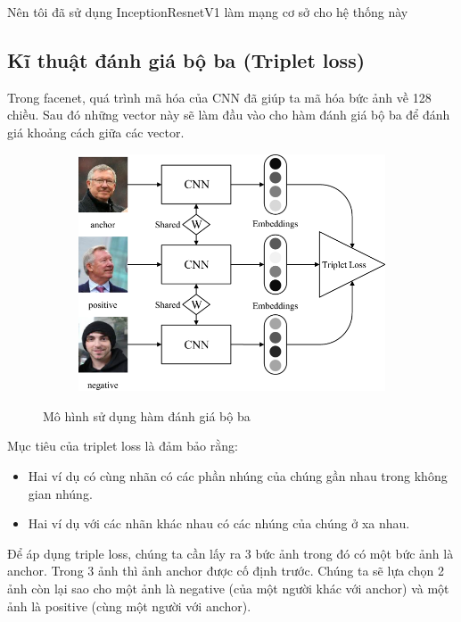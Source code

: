 Nên tôi đã sử dụng InceptionResnetV1 làm mạng cơ sở cho hệ thống này

\newpage
\subsection{Kĩ thuật đánh giá bộ ba (Triplet loss)}
Trong facenet, quá trình mã hóa của CNN đã giúp ta mã hóa bức ảnh về 128 chiều.
Sau đó những vector này sẽ làm đầu vào cho hàm đánh giá bộ ba để đánh giá khoảng
cách giữa các vector.

\begin{figure}
    \begin{subfigure}{1.\textwidth}
        \begin{center}
            \includegraphics[width=1.\linewidth]{Chapters/items/chap2_18.jpg}
        \end{center}
        \label{fig: chap2_18}
    \end{subfigure}
    \caption{Mô hình sử dụng hàm đánh giá bộ ba}
\end{figure}

Mục tiêu của triplet loss là đảm bảo rằng:
\begin{itemize}
    \item Hai ví dụ có cùng nhãn có các phần nhúng của chúng gần nhau trong không gian nhúng.
    \item Hai ví dụ với các nhãn khác nhau có các nhúng của chúng ở xa nhau.
\end{itemize}

Để áp dụng triple loss, chúng ta cần lấy ra 3 bức ảnh trong đó có một bức ảnh là anchor.
Trong 3 ảnh thì ảnh anchor được cố định trước.
Chúng ta sẽ lựa chọn 2 ảnh còn lại sao cho một ảnh là negative
(của một người khác với anchor) và một ảnh là positive (cùng một người với anchor).

